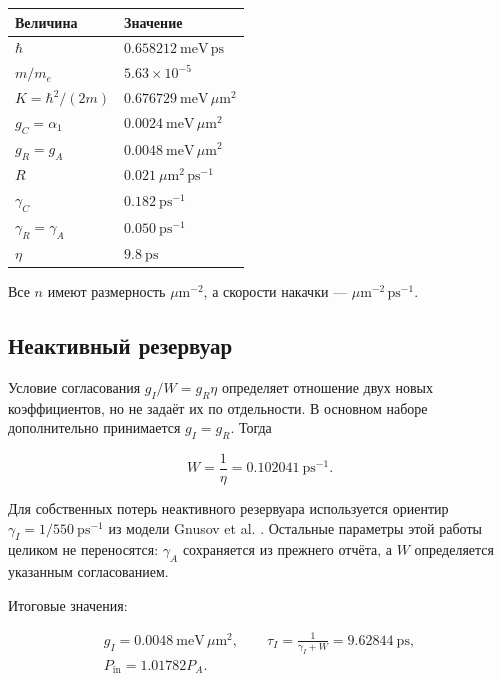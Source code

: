 \documentclass[12pt,a4paper]{article}
\begin{document}
\begin{center}\begin{tabular}{@{}p{}p{}@{}}\toprule
Величина & Значение\\\midrule
\(\hbar\) & \(0.658212\ \mathrm{meV}\,\mathrm{ps}\)\\
\(m/m_e\) & \(5.63\times10^{-5}\)\\
\(K=\hbar^2/(2m)\) & \(0.676729\ \mathrm{meV}\,\mu\mathrm m^2\)\\
\(g_C=\alpha_1\) & \(0.0024\ \mathrm{meV}\,\mu\mathrm m^2\)\\
\(g_R=g_A\) & \(0.0048\ \mathrm{meV}\,\mu\mathrm m^2\)\\
\(R\) & \(0.021\ \mu\mathrm m^2\,\mathrm{ps}^{-1}\)\\
\(\gamma_C\) & \(0.182\ \mathrm{ps}^{-1}\)\\
\(\gamma_R=\gamma_A\) & \(0.050\ \mathrm{ps}^{-1}\)\\
\(\eta\) & \(9.8\ \mathrm{ps}\)\\
\bottomrule\end{tabular}\end{center}

Все \(n\) имеют размерность \(\mu\mathrm m^{-2}\), а скорости накачки — \(\mu\mathrm m^{-2}\,\mathrm{ps}^{-1}\).

\subsection{Неактивный резервуар}\label{sec:A.2}

Условие согласования \(g_I/W=g_R\eta\) определяет отношение двух новых коэффициентов, но не задаёт их по отдельности. В основном наборе дополнительно принимается \(g_I=g_R\). Тогда

\[
W=\frac{1}{\eta}=0.102041\ \mathrm{ps}^{-1}.
\]

Для собственных потерь неактивного резервуара используется ориентир \(\gamma_I=1/550\ \mathrm{ps}^{-1}\) из модели Gnusov et al. \cite{ref2}. Остальные параметры этой работы целиком не переносятся: \(\gamma_A\) сохраняется из прежнего отчёта, а \(W\) определяется указанным согласованием.

Итоговые значения:

\[
\begin{gathered}
g_I=0.0048\ \mathrm{meV}\,\mu\mathrm m^2,\qquad
\tau_I=\frac{1}{\gamma_I+W}=9.62844\ \mathrm{ps},\\[0.5em]
P_{\mathrm{in}}=1.01782P_A.
\end{gathered}
\]
\end{document}
